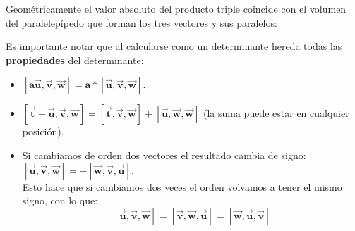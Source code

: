 \documentclass[a4paper,11pt,answers]{exam}
\begin{document}
Geométricamente el valor absoluto del producto triple coincide con el volumen del paralelepípedo que forman los tres vectores y sus paralelos:
\begin{center}
\end{center}

Es importante notar que al calcularse como un determinante hereda todas las \textbf{propiedades} del determinante:
\begin{itemize}
	\item $\boldsymbol{[a \vec u, \vec v, \vec w] = a *[\vec u, \vec v, \vec w]}$.
	\item $\boldsymbol{[\vec t + \vec u , \vec v , \vec w] = [\vec t, \vec v, \vec w] + [\vec u,\vec w, \vec w]}$ (la suma puede estar en cualquier posición).
	\item Si cambiamos de orden dos vectores el resultado cambia de signo: $\boldsymbol{[\vec u, \vec v, \vec w] = -[\vec w, \vec v, \vec u]}$.\\
	Esto hace que si cambiamos dos veces el orden volvamos a tener el mismo signo, con lo que:
	\[\boldsymbol{[\vec u, \vec v,\vec w] = [\vec v, \vec w, \vec u] =[\vec w, \vec u, \vec v]}\]
	
\end{itemize}
\end{document}
